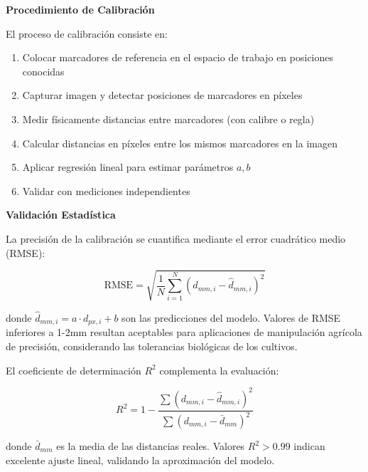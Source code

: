 \textbf{Procedimiento de Calibración}

El proceso de calibración consiste en:

\begin{enumerate}
\item Colocar marcadores de referencia en el espacio de trabajo en posiciones conocidas
\item Capturar imagen y detectar posiciones de marcadores en píxeles
\item Medir físicamente distancias entre marcadores (con calibre o regla)
\item Calcular distancias en píxeles entre los mismos marcadores en la imagen
\item Aplicar regresión lineal para estimar parámetros $a, b$
\item Validar con mediciones independientes
\end{enumerate}

\textbf{Validación Estadística}

La precisión de la calibración se cuantifica mediante el error cuadrático medio (RMSE):

\begin{equation}
\text{RMSE} = \sqrt{\frac{1}{N}\sum_{i=1}^{N}(d_{mm,i} - \hat{d}_{mm,i})^2}
\end{equation}

donde $\hat{d}_{mm,i} = a \cdot d_{px,i} + b$ son las predicciones del modelo. Valores de RMSE inferiores a 1-2mm resultan aceptables para aplicaciones de manipulación agrícola de precisión, considerando las tolerancias biológicas de los cultivos.

El coeficiente de determinación $R^2$ complementa la evaluación:

\begin{equation}
R^2 = 1 - \frac{\sum (d_{mm,i} - \hat{d}_{mm,i})^2}{\sum (d_{mm,i} - \bar{d}_{mm})^2}
\end{equation}

donde $\bar{d}_{mm}$ es la media de las distancias reales. Valores $R^2 > 0.99$ indican excelente ajuste lineal, validando la aproximación del modelo.
